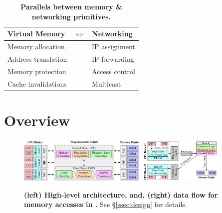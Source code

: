 
\begin{table}
    \caption{\small \textbf{Parallels between memory \& networking primitives.}}\vspace{-1em}
    \label{table:isomorph}
    \centering
    \scriptsize
    \renewcommand{\arraystretch}{1.2}
    \begin{tabular}{p{2cm} p{0.7cm}p{2cm}}
      \hline
      \textbf{Virtual Memory} &$\Longleftrightarrow$ &\textbf{Networking} \\\hline\hline
      Memory allocation&&IP assignment\\
      Address translation &&IP forwarding\\
      Memory protection  &&Access control\\
      Cache invalidations &&Multicast\\
      \hline
    \end{tabular}
    \vspace{-1em}
\end{table}

\section{\mind Overview}
\label{sec:mindoverview}

\begin{figure}[!t]
\centering
\includegraphics[width=0.55\textwidth]{fig/mind/design}\hspace{3em}
\includegraphics[width=0.35\textwidth]{fig/mind/data_flow}%
\vspace{-0.5em}
\caption{\textbf{(left) High-level \mind architecture, and, (right) data flow for memory accesses in \mind.} See \S\ref{ssec:design} for details.}
\label{fig:system_diagram}
\end{figure}

